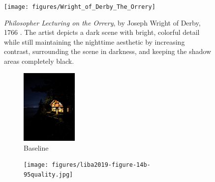 \documentclass{sig-alternate}
\begin{document}
\begin{figure}
\centering
\texttt{[image: figures/Wright\_of\_Derby\_The\_Orrery]}
\caption{ \emph{Philosopher Lecturing on the Orrery}, by Joseph Wright of Derby, 1766 \cite{file:theOrrery}. The artist depicts a dark scene with bright, colorful detail while still maintaining the nighttime aesthetic by increasing contrast, surrounding the scene in darkness, and keeping the shadow areas completely black.~\cite{blog:Wronski2018}}
\label{fig:theOrrery}
\end{figure}

\begin{figure}
\centering
\begin{subfigure}{6.5pc}
\centering
\includegraphics[width=6.5pc]{figures/liba2019-figure-14a-95quality.jpg}
\caption{Baseline}
\label{fig:toneMapping:baseline}
\end{subfigure}
\begin{subfigure}{6.5pc}
\centering
\texttt{[image: figures/liba2019-figure-14b-95quality.jpg]}

\end{subfigure}
\end{figure}
\end{document}

